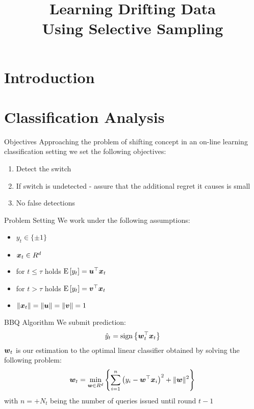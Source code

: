 \documentclass{beamer}
\title{Learning Drifting Data \\Using Selective Sampling}    %
\begin{document}
\maketitle
\section{Introduction}


\section{Classification Analysis}
\begin{frame}{Objectives}
Approaching the problem of shifting concept in an on-line learning classification setting we set the following objectives:
\begin{enumerate}
\item Detect the switch
\item If switch is undetected - assure that the additional regret it causes is small
\item No false detections
\end{enumerate}

\end{frame}

\begin{frame}{Problem Setting}
We work under the following assumptions:
\begin{itemize}
\item $y_t\in\{\pm1\}$
\item ${\boldsymbol{x}}_{t}\in R^d$
\item for $t\leq\tau$ holds ${\rm E}\left[{y_t}\right]={{\boldsymbol{u}}}^{\top}{\boldsymbol{x}}_{t}$
\item for $t>\tau$ holds ${\rm E}\left[{y_t}\right]={{\boldsymbol{v}}}^{\top}{\boldsymbol{x}}_{t}$
\item $\|{\boldsymbol{x}}_{t}\|=\|{\boldsymbol{u}}\|=\|{\boldsymbol{v}}\|=1$
\end{itemize}


\end{frame}

\begin{frame}{BBQ Algorithm}
We submit prediction:
\begin{equation}
\hat{y}_t={\rm sign}\left\{{{\boldsymbol{w}}}^{\top}_{t}{\boldsymbol{x}}_{t}\right\}
\end{equation}
\newline
${\boldsymbol{w}}_{t}$ is our estimation to the optimal linear classifier obtained by solving the following problem:
\begin{equation}
{\boldsymbol{w}}_{t}=\min_{{\boldsymbol{w}}\in R^d}{\left\{\sum\limits_{i=1}^{n}\left(y_i-{{\boldsymbol{w}}}^{\top}{\boldsymbol{x}}_{i}\right)^2+\|{\boldsymbol{w}}\|^2\right\}}
\label{RLS_prob}
\end{equation}
with $n=+N_t$ being the number of queries issued until round $t-1$
\end{frame}
\end{document}
